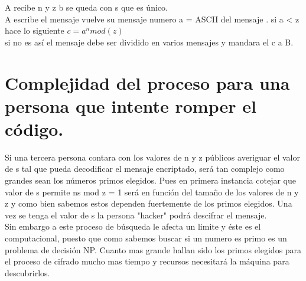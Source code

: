 \documentclass[a4paper,10pt]{article}
\begin{document}
A recibe n y z b se queda con s que es único.\\

A escribe el mensaje vuelve su mensaje numero a = ASCII del mensaje . si a < z hace lo siguiente $c= a^nmod(z)$\\

 
si no es así el mensaje debe ser dividido en varios mensajes y mandara el c a B.




\section{Complejidad del proceso para una persona que intente romper el código.}
Si una tercera persona contara con los valores de n y z públicos averiguar el valor de s tal que pueda decodificar el mensaje encriptado, será tan complejo como grandes sean los números primos elegidos. Pues en primera instancia cotejar que valor de s permite ns mod z = 1 será en función del tamaño de los valores de n y z y como bien sabemos estos dependen fuertemente de los primos elegidos. Una vez se tenga el valor de s la persona "hacker" podrá descifrar el mensaje.\\

Sin embargo a este proceso de búsqueda le afecta un limite y éste es el computacional, puesto que como sabemos buscar si un numero es primo es un problema de decisión NP. Cuanto mas grande hallan sido los primos elegidos para el proceso de cifrado mucho mas tiempo y recursos necesitará la máquina para descubrirlos.
\end{document}
